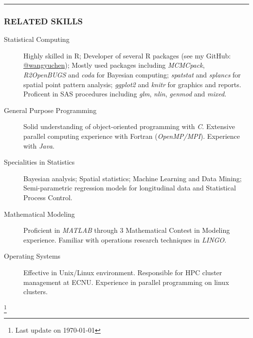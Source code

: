 \documentclass[11pt]{article}
\newcommand{\CPP}
{C\nolinebreak[4]\hspace{-.05em}\raisebox{.22ex}{\footnotesize\bf ++}}
\begin{document}
	\vspace{0.2em}
	\hrule

	\subsubsection*{\centering RELATED SKILLS}
	\vspace{-.3em}

	\begin{description}
		\item[Statistical Computing] Highly skilled in R; Developer of several R packages (see my GitHub: \href{https://www.github.com/wangyuchen}{@wangyuchen}); Mostly used packages including \emph{MCMCpack}, \emph{R2OpenBUGS} and \emph{coda} for Bayesian computing; \emph{spatstat} and \emph{splancs} for spatial point pattern analysis; \emph{ggplot2} and \emph{knitr} for graphics and reports. Proficent in SAS procedures including \emph{glm}, \emph{nlin}, \emph{genmod} and \emph{mixed}.
		\item[General Purpose Programming] Solid understanding of object-oriented programming with \emph{\CPP}. Extensive parallel computing experience with Fortran (\emph{OpenMP/MPI}). Experience with \emph{Java}.
		\item[Specialities in Statistics] Bayesian analysis; Spatial statistics; Machine Learning and Data Mining; Semi-parametric regression models for longitudinal data and Statistical Process Control.
		\item[Mathematical Modeling] Proficient in \emph{MATLAB} through 3 Mathematical Contest in Modeling experience. Familiar with operations research techniques in \emph{LINGO}.
		\item[Operating Systems] Effective in Unix/Linux environment. Responsible for HPC cluster management at ECNU. Experience in parallel programming on linux clusters.
	\end{description}


\let\thefootnote\relax\footnote{Last update on \today}
\end{document}
